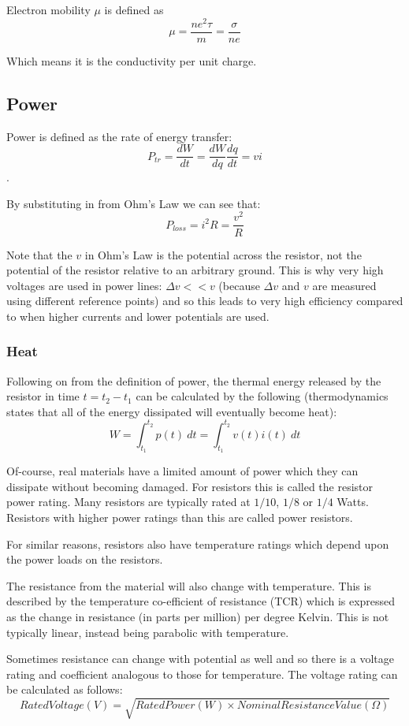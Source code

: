\documentclass[11pt,a4paper]{report}
\begin{document}
Electron mobility $\mu$ is defined as
\[\mu = \frac{ne^2\tau}{m} = \frac{\sigma}{ne}\]

Which means it is the conductivity per unit charge.

\subsection{Power}
Power is defined as the rate of energy transfer:
\[P_{tr} = \frac{dW}{dt} = \frac{dW}{dq}\frac{dq}{dt} = vi\].

By substituting in from Ohm's Law we can see that:
\[P_{loss} = i^2R = \frac{v^2}{R}\]

Note that the $v$ in Ohm's Law is the potential across the resistor, not the potential of the resistor relative to an arbitrary ground. This is why very high voltages are used in power lines: $\Delta v << v$ (because $\Delta v$ and $v$ are measured using different reference points) and so this leads to very high efficiency compared to when higher currents and lower potentials are used.

\subsubsection{Heat}
Following on from the definition of power, the thermal energy released by the resistor in time $t = t_2 - t_1$ can be calculated by the following (thermodynamics states that all of the energy dissipated will eventually become heat):
\[W=\int_{t_1}^{t_2} p(t) \: dt = \int_{t_1}^{t_2} v(t)i(t) \: dt\]

Of-course, real materials have a limited amount of power which they can dissipate without becoming damaged. For resistors this is called the resistor power rating. Many resistors are typically rated at $1/10$, $1/8$ or $1/4$ Watts. Resistors with higher power ratings than this are called power resistors.

For similar reasons, resistors also have temperature ratings which depend upon the power loads on the resistors.

The resistance from the material will also change with temperature. This is described by the temperature co-efficient of resistance (TCR) which is expressed as the change in resistance (in parts per million) per degree Kelvin. This is not typically linear, instead being parabolic with temperature.

Sometimes resistance can change with potential as well and so there is a voltage rating and coefficient analogous to those for temperature. The voltage rating can be calculated as follows:
\[Rated Voltage(V)=\sqrt{Rated Power(W) \times Nominal Resistance Value(\Omega)}\]
\end{document}
